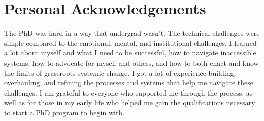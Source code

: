 
\section*{Personal Acknowledgements}
The PhD was hard in a way that undergrad wasn't.
The technical challenges were simple compared to the emotional, mental, and institutional challenges.
I learned a lot about myself and what I need to be successful,
how to navigate inaccessible systems, how to advocate for myself and others, 
and how to both enact and know the limits of grassroots systemic change.
I got a lot of experience building, overhauling, 
and refining the processes and systems that help me navigate these challenges.
I am grateful to everyone who supported me through the process,
as well as for those in my early life who helped me gain the qualifications necessary to start a PhD program to begin with.

